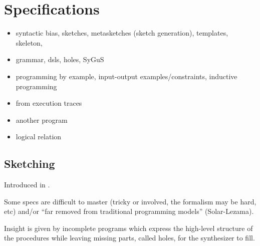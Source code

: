 \section{Specifications}
\label{sec:specifications}

\begin{itemize}
\item syntactic bias, sketches, metasketches (sketch generation), templates, skeleton,
\item   grammar, dsls, holes, SyGuS
\item programming by example, input-output examples/constraints, inductive programming
\item from execution traces
\item another program
\item logical relation
\end{itemize}

\subsection{Sketching}

Introduced in \cite{Solar-Lezama:2008}.

Some specs are difficult to master (tricky or involved, the formalism may be
hard, etc) and/or ``far removed from traditional programming models'' (Solar-Lezama).

Insight is given by incomplete programs which express the high-level structure
of the procedures while leaving missing parts, called holes, for the synthesizer
to fill.


